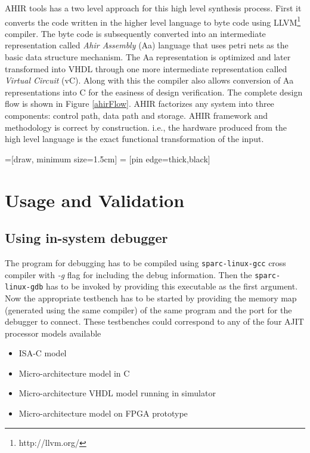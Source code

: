AHIR tools has a two level approach for this high level synthesis process. First it converts the code written in the higher level language to byte code using LLVM\footnote{http://llvm.org/} compiler. The byte code is subsequently converted into an intermediate representation called \textit{Ahir Assembly} (Aa) language that uses petri nets as the basic data structure mechanism. The Aa representation is optimized and later transformed into VHDL through one more intermediate representation called \textit{Virtual Circuit} (vC). Along with this the compiler also allows conversion of Aa representations into C for the easiness of design verification. The complete design flow is shown in Figure \ref{ahirFlow}. AHIR factorizes any system into three components: control path, data path and storage. AHIR framework and methodology is correct by construction. i.e., the hardware produced from the high level language is the exact functional transformation of the input.

=[draw, minimum size=1.5cm]
 = [pin edge={thick,black}]

\label{ahirFlow}

\section{Usage and Validation}
\subsection{Using in-system debugger}
The program for debugging has to be compiled using \texttt{sparc-linux-gcc} cross compiler with \textit{-g} flag for including the debug information. Then the \texttt{sparc-linux-gdb} has to be invoked by providing this executable as the first argument. Now the appropriate testbench has to be started by providing the memory map (generated using the same compiler) of the same program and the port for the debugger to connect. These testbenches could correspond to any of the four AJIT processor models available
\begin{itemize}
	\item ISA-C model
	\item Micro-architecture model in C
	\item Micro-architecture VHDL model running in simulator
	\item Micro-architecture model on FPGA prototype
\end{itemize}

